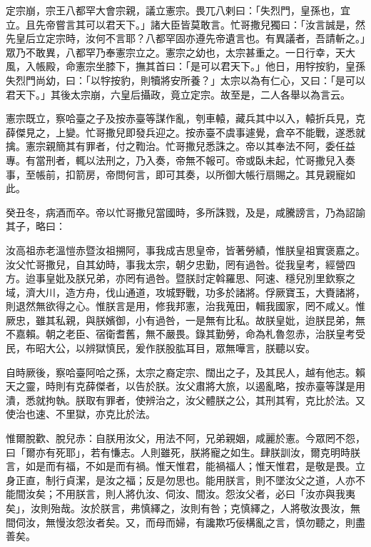 \begin{pinyinscope}
 定宗崩，宗王八都罕大會宗親，議立憲宗。畏兀八剌曰：「失烈門，皇孫也，宜立。且先帝嘗言其可以君天下。」諸大臣皆莫敢言。忙哥撒兒獨曰：「汝言誠是，然先皇后立定宗時，汝何不言耶？八都罕固亦遵先帝遺言也。有異議者，吾請斬之。」眾乃不敢異，八都罕乃奉憲宗立之。憲宗之幼也，太宗甚重之。一日行幸，天大風，入帳殿，命憲宗坐膝下，撫其首曰：「是可以君天下。」他日，用牸按豹，皇孫失烈門尚幼，曰：「以牸按豹，則犢將安所養？」太宗以為有仁心，又曰：「是可以君天下。」其後太宗崩，六皇后攝政，竟立定宗。故至是，二人各舉以為言云。



 憲宗既立，察哈臺之子及按赤臺等謀作亂，刳車轅，藏兵其中以入，轅折兵見，克薛傑見之，上變。忙哥撒兒即發兵迎之。按赤臺不虞事遽覺，倉卒不能戰，遂悉就擒。憲宗親簡其有罪者，付之鞫治。忙哥撒兒悉誅之。帝以其奉法不阿，委任益專。有當刑者，輒以法刑之，乃入奏，帝無不報可。帝或臥未起，忙哥撒兒入奏事，至帳前，扣箭房，帝問何言，即可其奏，以所御大帳行扇賜之。其見親寵如此。



 癸丑冬，病酒而卒。帝以忙哥撒兒當國時，多所誅戮，及是，咸騰謗言，乃為詔諭其子，略曰：



 汝高祖赤老溫愷赤暨汝祖搠阿，事我成吉思皇帝，皆著勞績，惟朕皇祖實褒嘉之。汝父忙哥撒兒，自其幼時，事我太宗，朝夕忠勤，罔有過咎。從我皇考，經營四方。迨事皇妣及朕兄弟，亦罔有過咎。暨朕討定斡羅思、阿速、穩兒別里欽察之域，濟大川，造方舟，伐山通道，攻城野戰，功多於諸將。俘厥寶玉，大賚諸將，則退然無欲得之心。惟朕言是用，修我邦憲，治我蒐田，輯我國家，罔不咸乂。惟厥忠，雖其私親，與朕嬪御，小有過咎，一是無有比私。故朕皇妣，迨朕昆弟，無不嘉賴。朝之老臣、宿衛耆舊，無不嚴畏。錄其勤勞，命為札魯忽赤，治朕皇考受民，布昭大公，以辨獄慎民，爰作朕股肱耳目，眾無嘩言，朕聽以安。



 自時厥後，察哈臺阿哈之孫，太宗之裔定宗、闊出之子，及其民人，越有他志。賴天之靈，時則有克薛傑者，以告於朕。汝父肅將大旅，以遏亂略，按赤臺等謀是用潰，悉就拘執。朕取有罪者，使辨治之，汝父體朕之公，其刑其宥，克比於法。又使治也速、不里獄，亦克比於法。



 惟爾脫歡、脫兒赤：自朕用汝父，用法不阿，兄弟親姻，咸麗於憲。今眾罔不怨，曰「爾亦有死耶」，若有慊志。人則雖死，朕將寵之如生。肆朕訓汝，爾克明時朕言，如是而有福，不如是而有禍。惟天惟君，能禍福人；惟天惟君，是敬是畏。立身正直，制行貞潔，是汝之福；反是勿思也。能用朕言，則不墜汝父之道，人亦不能間汝矣；不用朕言，則人將仇汝、伺汝、間汝。怨汝父者，必曰「汝亦與我夷矣」，汝則殆哉。汝於朕言，弗慎繹之，汝則有咎；克慎繹之，人將敬汝畏汝，無間伺汝，無慢汝怨汝者矣。又，而母而婦，有讒欺巧佞構亂之言，慎勿聽之，則盡善矣。




\end{pinyinscope}
